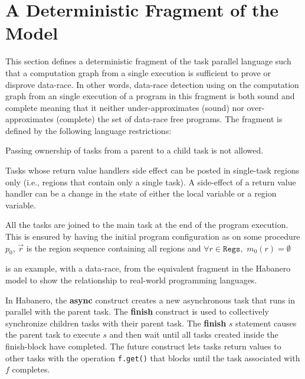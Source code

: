\section{A Deterministic Fragment of the Model}
\label{sec:otf-drd}
This section defines a deterministic fragment of the task parallel language such that a computation graph from a single execution is sufficient to prove or disprove data-race. In other words, data-race detection using  on the computation graph from an single execution of a program in this fragment is both sound and complete meaning that it neither under-approximates (sound) nor over-approximates (complete) the set of data-race free programs. The fragment is defined by the following language restrictions:
\begin{compactitem}
\item Passing ownership of tasks from a parent to a child task is not allowed. 
\item Tasks whose return value handlers side effect can be posted in single-task regions only (i.e., regions that contain only a single task). A side-effect of a return value handler can be a change in the state of either the local variable or a region variable. 
\item All the tasks are joined to the main task at the end of the program execution. This is ensured by having the initial program configuration as  on some procedure $p_0$, $\vec{r}$ is the region sequence containing all regions and $\forall r \in \mathtt{Regs},$ $m_0(r) = \emptyset$
\end{compactitem}
 is an example, with a data-race, from the equivalent fragment in the Habanero model to show the relationship to real-world programming languages. 

In Habanero, the \textbf{async} construct creates a new asynchronous task that runs in parallel with the parent task. The \textbf{finish} construct is used to collectively synchronize children tasks with their parent task. The \textbf{finish} $s$ statement causes the parent task to execute $s$ and then wait until all tasks created inside the finish-block have completed. The future construct lets tasks return values to other tasks with the operation \texttt{f.get()} that blocks until the task associated with $f$ completes. 

